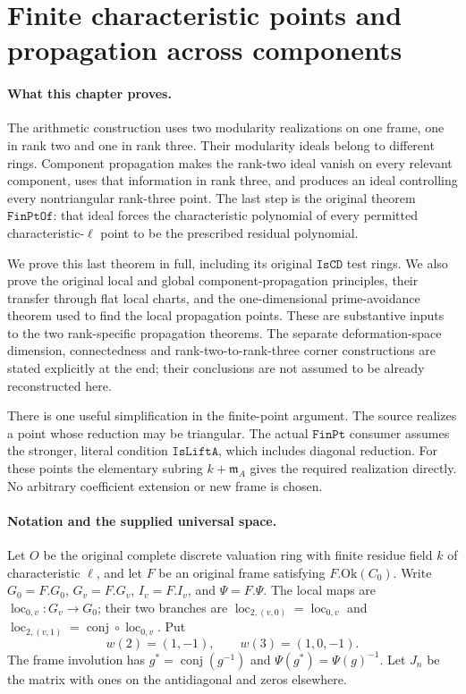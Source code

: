 \section{Finite characteristic points and propagation across components}
\label{sec:arithmetic-component-propagation}

\paragraph{What this chapter proves.}
The arithmetic construction uses two modularity realizations on one
frame, one in rank two and one in rank three.  Their modularity ideals
belong to different rings.  Component propagation makes the rank-two
ideal vanish on every relevant component, uses that information in
rank three, and produces an ideal controlling every nontriangular
rank-three point.  The last step is the original theorem
\(\texttt{FinPtOf}\): that ideal forces the characteristic polynomial
of every permitted characteristic-\(\ell\) point to be the prescribed
residual polynomial.

We prove this last theorem in full, including its original
\(\texttt{IsCD}\) test rings.  We also prove the original local and
global component-propagation principles, their transfer through flat
local charts, and the one-dimensional prime-avoidance theorem used
to find the local propagation points.  These are substantive inputs
to the two rank-specific propagation theorems.  The separate
deformation-space dimension, connectedness and rank-two-to-rank-three
corner constructions are stated explicitly at the end; their
conclusions are not assumed to be already reconstructed here.

There is one useful simplification in the finite-point argument.
The source realizes a point whose reduction may be triangular.
The actual \(\texttt{FinPt}\) consumer assumes the stronger,
literal condition \(\texttt{IsLiftA}\), which includes diagonal
reduction.  For these points the elementary subring
\(k+\mathfrak m_A\) gives the required realization directly.
No arbitrary coefficient extension or new frame is chosen.

\paragraph{Notation and the supplied universal space.}
Let \(O\) be the original complete discrete valuation ring with
finite residue field \(k\) of characteristic \(\ell\), and let
\(F\) be an original frame satisfying \(F.\mathrm{Ok}(C_0)\).
Write \(G_0=F.G_0\), \(G_v=F.G_v\), \(I_v=F.I_v\), and
\(\Psi=F.\Psi\).  The local maps are
\(\operatorname{loc}_{0,v}:G_v\to G_0\); their two branches are
\(\operatorname{loc}_{2,(v,0)}=\operatorname{loc}_{0,v}\) and
\(\operatorname{loc}_{2,(v,1)}=\operatorname{conj}\circ
\operatorname{loc}_{0,v}\).  Put
\[
 w(2)=(1,-1),\qquad w(3)=(1,0,-1).
                                                        \tag{ACP.1}
\]
The frame involution has
\(g^*=\operatorname{conj}(g^{-1})\) and
\(\Psi(g^*)=\Psi(g)^{-1}\).  Let \(J_n\) be the matrix with
ones on the antidiagonal and zeros elsewhere.

